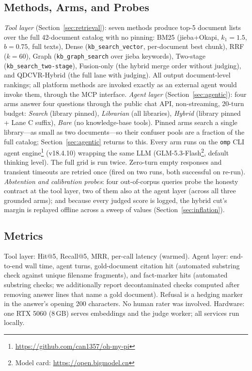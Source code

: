 \documentclass[journal]{IEEEtran}
\begin{document}
\subsection{Methods, Arms, and Probes}
\emph{Tool layer} (Section~\ref{sec:retrieval}): seven methods produce
top-5 document lists over the full 42-document catalog with no pinning:
BM25 (jieba+Okapi, $k_1{=}1.5$, $b{=}0.75$, full texts), Dense
(\texttt{kb\_search\_vector}, per-document best chunk), RRF ($k{=}60$),
Graph (\texttt{kb\_graph\_search} over jieba keywords), Two-stage
(\texttt{kb\_search\_two-stage}), Fusion-only (the hybrid merge order
without judging), and QDCVR-Hybrid (the full lane with judging). All
output document-level rankings; all platform methods are invoked exactly
as an external agent would invoke them, through the MCP interface.
\emph{Agent layer} (Section~\ref{sec:agentic}): four arms answer four
questions through the public chat API, non-streaming, 20-turn budget:
\emph{Search} (library pinned), \emph{Librarian} (all libraries),
\emph{Hybrid} (library pinned + Lane C suffix), \emph{Bare} (no
knowledge-base tools). Pinned arms search a single library---as small as
two documents---so their confuser pools are a fraction of the full
catalog; Section~\ref{sec:agentic} returns to this. Every arm runs on the
\texttt{omp} CLI agent engine\footnote{\url{https://github.com/can1357/oh-my-pi}}
(v18.4.10) wrapping the same LLM (GLM-5.3-Flash\footnote{Model card:
\url{https://open.bigmodel.cn}}, default thinking level). The full grid
is run twice. Zero-turn empty responses and transient timeouts are
retried once (fired on two runs, both successful on re-run).
\emph{Abstention and calibration probes}: four out-of-corpus queries
probe the honesty contract at the tool layer, two of them also at the
agent layer (across all three grounded arms); and because every judged
score is logged, the hybrid cut's margin is replayed offline across a
sweep of values (Section~\ref{sec:inflation}).

\subsection{Metrics}
Tool layer: Hit@5, Recall@5, MRR, per-call latency (warmed). Agent layer:
end-to-end wall time, agent turns, gold-document citation hit (automated
substring check against unique filename fragments), and fact-marker hits
(automated substring checks; we additionally report decontaminated checks
computed after removing answer lines that name a gold document). Refusal
is a hedging marker in the answer's opening 200 characters. No human
rater was involved. Hardware: one RTX 5060 (8\,GB) serves embeddings and
the judge worker; all services run locally.
\end{document}
